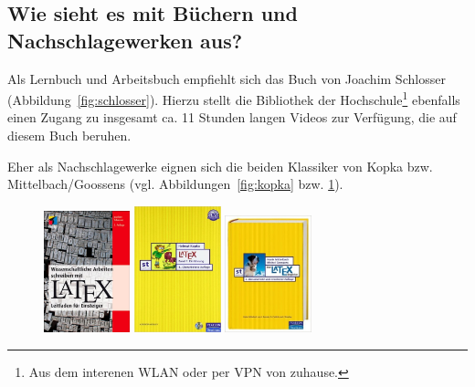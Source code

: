 \documentclass[pdftex,a4paper]{scrartcl}
\begin{document}
\subsection{Wie sieht es mit Büchern und Nachschlagewerken aus?}

Als Lernbuch und Arbeitsbuch empfiehlt sich das Buch von Joachim Schlosser (Abbildung~\ref{fig:schlosser}). Hierzu stellt die Bibliothek der Hochschule\footnote{Aus dem interenen WLAN oder per VPN von zuhause.} ebenfalls einen Zugang zu insgesamt ca. 11 Stunden langen Videos\autocite{schlosser:latex_tutorium} zur Verfügung, die auf diesem Buch beruhen.

Eher als Nachschlagewerke eignen sich die beiden Klassiker von Kopka bzw. Mittelbach/Goossens (vgl. Abbildungen~\ref{fig:kopka} bzw. \ref{fig:mittelbach_goossens}).

\begin{figure}[h!tbp]
\centering
\begin{minipage}[b]{0.3\textwidth}
\centering
\includegraphics[width=2.5cm]{images/schlosser_latex_buch}
\caption{\autocite{schlosser:latex_buch}}
\label{fig:schlosser}
\end{minipage}
\hfill
\begin{minipage}[b]{0.3\textwidth}
\centering
\includegraphics[width=2.5cm]{images/kopka_latex}
\caption{\autocite{kopka:latex}}
\label{fig:kopka}
\end{minipage}
\hfill
\begin{minipage}[b]{0.3\textwidth}
\centering
\includegraphics[width=2.5cm]{images/mittelbach_goossens_latex_begleiter}
\caption{\autocite{mittelbach_goossens:latex_begleiter}}
\label{fig:mittelbach_goossens}
\end{minipage}
\end{figure}
\end{document}

